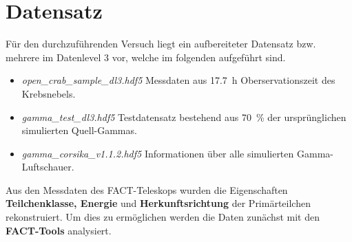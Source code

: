 \section{Datensatz}
Für den durchzuführenden Versuch liegt ein aufbereiteter Datensatz bzw. mehrere im Datenlevel 3 vor, welche im folgenden aufgeführt sind.
\begin{itemize}
	\item \textit{open\_crab\_sample\_dl3.hdf5} Messdaten aus \SI{17.7}{\hour} Oberservationszeit des Krebsnebels.
	\item \textit{gamma\_test\_dl3.hdf5} Testdatensatz bestehend aus \SI{70}{\percent} der ursprünglichen simulierten Quell-Gammas.
	\item \textit{gamma\_corsika\_v1.1.2.hdf5} Informationen über alle simulierten Gamma-Luftschauer.
\end{itemize}
Aus den Messdaten des FACT-Teleskops wurden die Eigenschaften \textbf{Teilchenklasse, Energie} und \textbf{Herkunftsrichtung} der Primärteilchen rekonstruiert.
Um dies zu ermöglichen werden die Daten zunächst mit den \textbf{FACT-Tools} \cite{kai_brugge_2018_2386762} analysiert. 
